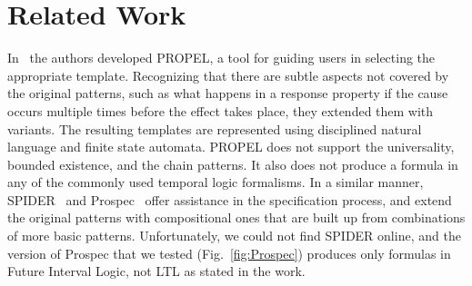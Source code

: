 \documentclass[letter]{llncs}
\begin{document}
\section{Related Work}
\label{sec:RelatedWork}
In~\cite{Smith02propel:an} the authors developed PROPEL, a tool for guiding users in 
selecting the appropriate template. Recognizing that there are subtle aspects
not covered by the original patterns, such as what happens in a response
property if the cause occurs multiple times before the effect takes place,
they extended them with variants. The resulting templates 
are represented using disciplined natural language and finite state automata. 
PROPEL does not support the universality, bounded existence, and the chain patterns. It also 
does not produce a formula in any of the commonly used temporal logic formalisms.
In a similar manner, SPIDER~\cite{konrad2005facilitating} and 
Prospec~\cite{Mondragon_prospec} offer assistance in the specification process, and extend the original patterns
with compositional ones that are built up from combinations of more basic patterns. 
Unfortunately, we could not find SPIDER online, and the version of Prospec that we tested (Fig.~\ref{fig:Prospec}) produces only 
formulas in Future Interval Logic, not LTL as stated in the work.
\end{document}

